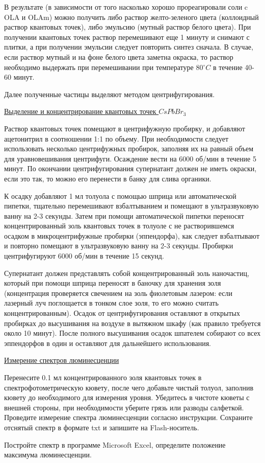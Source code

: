 В результате (в зависимости от того насколько хорошо прореагировали соли c OLA и OLAm) можно получить либо раствор желто-зеленого цвета (коллоидный раствор квантовых точек), либо эмульсию (мутный раствор белого цвета). При получении квантовых точек раствор перемешивают еще 1 минуту и снимают с плитки, а при получении эмульсии следует повторить синтез сначала. В случае, если раствор мутный и на фоне белого цвета заметна окраска, то раствор необходимо выдержать при перемешивании при температуре 80$^\circ C$ в течение 40-60 минут.

Далее полученные частицы выделяют методом центрифугирования.

\underline{Выделение и концентрирование квантовых точек $CsPbBr_3$}

Раствор квантовых точек помещают в центрифужную пробирку, и добавляют ацетонитрил в соотношении 1:1 по объему. При необходимости следует использовать несколько центрифужных пробирок, заполняя их на равный объем для уравновешивания центрифуги. Осаждение вести на 6000 об/мин в течение 5 минут.  По окончании центрифугирования супернатант должен не иметь окраски, если это так, то можно его перенести в банку для слива органики.

К осадку добавляют 1 мл толуола с помощью шприца или автоматической пипетки, тщательно перемешивают взбалтыванием и помещают в ультразвуковую ванну на 2-3 секунды. Затем при помощи автоматической пипетки переносят концентрированный золь квантовых точек в толуоле с не растворившемся осадком в микроцентрифужные пробирки (эппендорфа), как следует взбалтывают и повторно помещают в ультразвуковую ванну на 2-3 секунды. Пробирки центрифугируют 6000 об/мин в течение 15 секунд.

Супернатант должен представлять собой концентрированный золь наночастиц, который при помощи шприца переносят в баночку для хранения золя (концентрация проверяется свечением на золь фиолетовым лазером: если лазерный луч поглощается в тонком слое золя, то его можно считать концентрированным). Осадок от центрифугирования оставляют в открытых пробирках до высушивания на воздухе в вытяжном шкафу (как правило требуется около 10 минут). После полного высушивания осадок шпателем собирают со всех эппендорфов в один и оставляют для дальнейшего использования.

\underline{Измерение спектров люминесценции}

Перенесите 0.1 мл концентрированного золя квантовых точек в спектрофотометрическую кювету, после чего добавьте чистый толуол, заполнив кювету до необходимого для измерения уровня. Убедитесь в чистоте кюветы с внешней стороны, при необходимости уберите грязь или разводы салфеткой. Проведите измерение спектра люминесценции согласно инструкции. Сохраните отснятый спектр в формате txt и запишите на Flash-носитель.

Постройте спектр в программе Microsoft Excel, определите положение максимума люминесценции.